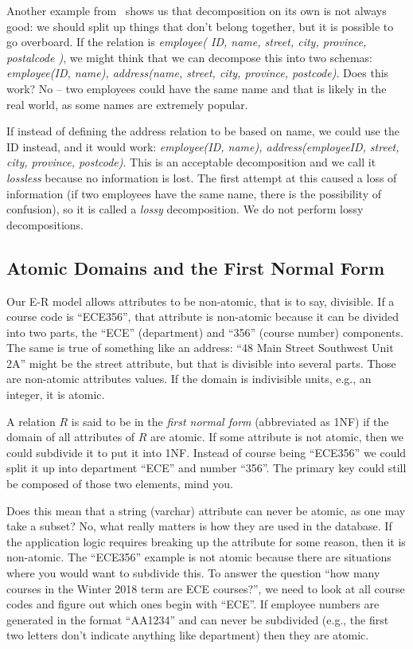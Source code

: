 Another example from~\cite{dsc} shows us that decomposition on its own is not always good: we should split up things that don't belong together, but it is possible to go overboard. If the relation is \textit{employee( ID, name, street, city, province, postalcode )}, we might think that we can decompose this into two schemas: \textit{employee(ID, name), address(name, street, city, province, postcode)}. Does this work? No -- two employees could have the same name and that is likely in the real world, as some names are extremely popular. 

If instead of defining the address relation to be based on name, we could use the ID instead, and it would work: \textit{employee(ID, name), address(employeeID, street, city, province, postcode)}. This is an acceptable decomposition and we call it \textit{lossless} because no information is lost. The first attempt at this caused a loss of information (if two employees have the same name, there is the possibility of confusion), so it is called a \textit{lossy} decomposition. We do not perform lossy decompositions.

\subsection*{Atomic Domains and the First Normal Form}

Our E-R model allows attributes to be non-atomic, that is to say, divisible. If a course code is ``ECE356'', that attribute is non-atomic because it can be divided into two parts, the ``ECE'' (department) and ``356'' (course number) components. The same is true of something like an address: ``48 Main Street Southwest Unit 2A'' might be the street attribute, but that is divisible into several parts. Those are non-atomic attributes values. If the domain is indivisible units, e.g., an integer, it is atomic.

A relation $R$ is said to be in the \textit{first normal form} (abbreviated as 1NF) if the domain of all attributes of $R$ are atomic. If some attribute is not atomic, then we could subdivide it to put it into 1NF. Instead of course being ``ECE356'' we could split  it up into department ``ECE'' and number ``356''. The primary key could still be composed of those two elements, mind you.

Does this mean that a string (varchar) attribute can never be atomic, as one may take a subset? No, what really matters is how they are used in the database. If the application logic requires breaking up the attribute for some reason, then it is non-atomic. The ``ECE356'' example is not atomic because there are situations where you would want to subdivide this. To answer the question ``how many courses in the Winter 2018 term are ECE courses?'', we need to look at all course codes and figure out which ones begin with ``ECE''. If employee numbers are generated in the format ``AA1234'' and can never be subdivided (e.g., the first two letters don't indicate anything like department) then they are atomic. 

